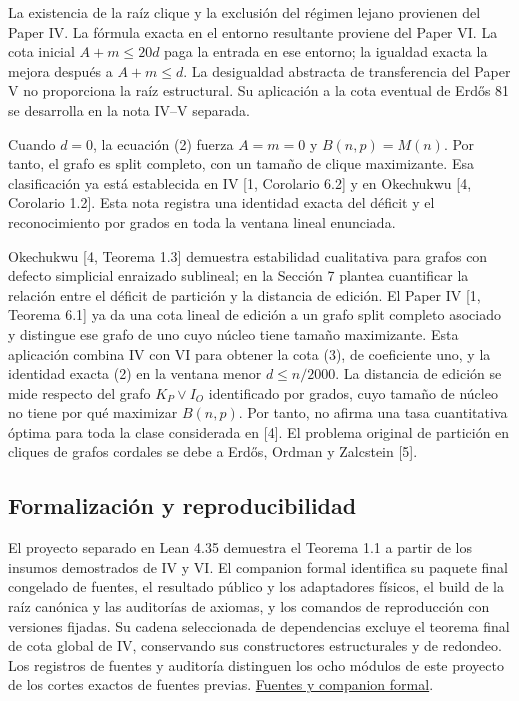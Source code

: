 \documentclass[spanish,11pt,a4paper]{article}
\begin{document}
La existencia de la raíz clique y la exclusión del régimen lejano
provienen del Paper IV. La fórmula exacta en el entorno resultante
proviene del Paper VI. La cota inicial \(A+m\le20d\) paga la entrada en
ese entorno; la igualdad exacta la mejora después a \(A+m\le d\). La
desigualdad abstracta de transferencia del Paper V no proporciona la
raíz estructural. Su aplicación a la cota eventual de Erdős 81 se
desarrolla en la nota IV--V separada.

Cuando \(d=0\), la ecuación (2) fuerza \(A=m=0\) y \(B(n,p)=M(n)\). Por
tanto, el grafo es split completo, con un tamaño de clique maximizante.
Esa clasificación ya está establecida en IV {[}1, Corolario 6.2{]} y en
Okechukwu {[}4, Corolario 1.2{]}. Esta nota registra una identidad
exacta del déficit y el reconocimiento por grados en toda la ventana
lineal enunciada.

Okechukwu {[}4, Teorema 1.3{]} demuestra estabilidad cualitativa para
grafos con defecto simplicial enraizado sublineal; en la Sección 7
plantea cuantificar la relación entre el déficit de partición y la
distancia de edición. El Paper IV {[}1, Teorema 6.1{]} ya da una cota
lineal de edición a un grafo split completo asociado y distingue ese
grafo de uno cuyo núcleo tiene tamaño maximizante. Esta aplicación
combina IV con VI para obtener la cota (3), de coeficiente uno, y la
identidad exacta (2) en la ventana menor \(d\le n/2000\). La distancia
de edición se mide respecto del grafo \(K_P\vee I_O\) identificado por
grados, cuyo tamaño de núcleo no tiene por qué maximizar \(B(n,p)\). Por
tanto, no afirma una tasa cuantitativa óptima para toda la clase
considerada en {[}4{]}. El problema original de partición en cliques de
grafos cordales se debe a Erdős, Ordman y Zalcstein {[}5{]}.

\subsection{Formalización y
reproducibilidad}\label{formalizaciuxf3n-y-reproducibilidad}

El proyecto separado en Lean 4.35 demuestra el Teorema 1.1 a partir de
los insumos demostrados de IV y VI. El companion formal identifica su
paquete final congelado de fuentes, el resultado público y los
adaptadores físicos, el build de la raíz canónica y las auditorías de
axiomas, y los comandos de reproducción con versiones fijadas. Su cadena
seleccionada de dependencias excluye el teorema final de cota global de
IV, conservando sus constructores estructurales y de redondeo. Los
registros de fuentes y auditoría distinguen los ocho módulos de este
proyecto de los cortes exactos de fuentes previas.
\href{https://github.com/jtraverso/erdos-81-chordal-clique-partitions/tree/main/series_notes/NOTE_II_CHORDAL_STABILITY/05_formalization}{Fuentes
y companion formal}.
\end{document}
